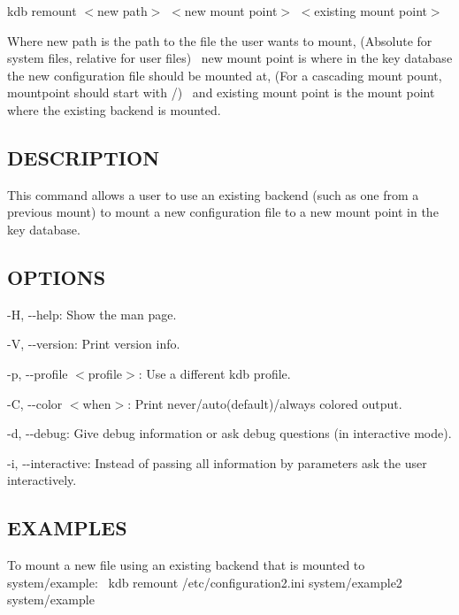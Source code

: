 {\ttfamily kdb remount $<$new path$>$ $<$new mount point$>$ $<$existing mount point$>$}

Where {\ttfamily new path} is the path to the file the user wants to mount, (Absolute for system files, relative for user files)~\newline
 {\ttfamily new mount point} is where in the key database the new configuration file should be mounted at, (For a cascading mount pount, {\ttfamily mountpoint} should start with {\ttfamily /})~\newline
 and {\ttfamily existing mount point} is the mount point where the existing backend is mounted.~\newline


\subsection*{D\+E\+S\+C\+R\+I\+P\+T\+I\+ON}

This command allows a user to use an existing backend (such as one from a previous mount) to mount a new configuration file to a new mount point in the key database.~\newline


\subsection*{O\+P\+T\+I\+O\+NS}


\begin{DoxyItemize}
\item {\ttfamily -\/H}, {\ttfamily -\/-\/help}\+: Show the man page.
\item {\ttfamily -\/V}, {\ttfamily -\/-\/version}\+: Print version info.
\item {\ttfamily -\/p}, {\ttfamily -\/-\/profile $<$profile$>$}\+: Use a different kdb profile.
\item {\ttfamily -\/C}, {\ttfamily -\/-\/color $<$when$>$}\+: Print never/auto(default)/always colored output.
\item {\ttfamily -\/d}, {\ttfamily -\/-\/debug}\+: Give debug information or ask debug questions (in interactive mode).
\item {\ttfamily -\/i}, {\ttfamily -\/-\/interactive}\+: Instead of passing all information by parameters ask the user interactively.
\end{DoxyItemize}

\subsection*{E\+X\+A\+M\+P\+L\+ES}

To mount a new file using an existing backend that is mounted to {\ttfamily system/example}\+:~\newline
 {\ttfamily kdb remount /etc/configuration2.ini system/example2 system/example}~\newline
 